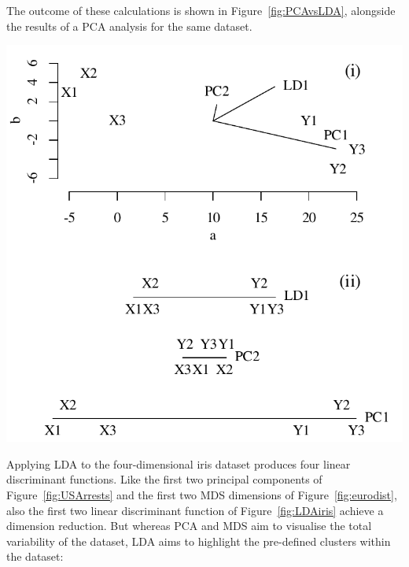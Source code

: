 The outcome of these calculations is shown in
Figure~\ref{fig:PCAvsLDA}, alongside the results of a PCA analysis for
the same dataset.

\noindent\begin{minipage}[t][][b]{.55\textwidth}
  \noindent\includegraphics[width=\linewidth]{../figures/PCAvsLDA.pdf}\\
\end{minipage}
\begin{minipage}[t][][t]{.45\textwidth}
  \label{fig:PCAvsLDA}
\end{minipage}
  
Applying LDA to the four-dimensional iris dataset produces four linear
discriminant functions. Like the first two principal components of
Figure~\ref{fig:USArrests} and the first two MDS dimensions of
Figure~\ref{fig:eurodist}, also the first two linear discriminant
function of Figure~\ref{fig:LDAiris} achieve a dimension
reduction. But whereas PCA and MDS aim to visualise the total
variability of the dataset, LDA aims to highlight the pre-defined
clusters within the dataset:

